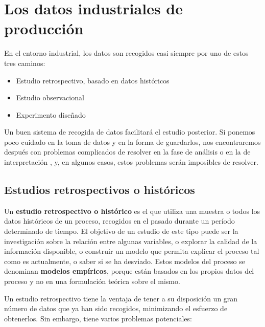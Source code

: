 \documentclass[
  letterpaper,
  DIV=11,
  numbers=noendperiod,
  oneside]{scrreprt}
\providecommand{\tightlist}{%
  \setlength{\itemsep}{0pt}\setlength{\parskip}{0pt}}\usepackage{longtable,booktabs,array}
\begin{document}
\hypertarget{los-datos-industriales-de-producciuxf3n}{%
\chapter{Los datos industriales de
producción}\label{los-datos-industriales-de-producciuxf3n}}

En el entorno industrial, los datos son recogidos casi siempre por uno
de estos tres caminos:

\begin{itemize}
\tightlist
\item
  Estudio retrospectivo, basado en datos históricos
\item
  Estudio observacional
\item
  Experimento diseñado
\end{itemize}

Un buen sistema de recogida de datos facilitará el estudio posterior. Si
ponemos poco cuidado en la toma de datos y en la forma de guardarlos,
nos encontraremos después con problemas complicados de resolver en la
fase de análisis o en la de interpretación , y, en algunos casos, estos
problemas serán imposibles de resolver.

\hypertarget{estudios-retrospectivos-o-histuxf3ricos}{%
\section{Estudios retrospectivos o
históricos}\label{estudios-retrospectivos-o-histuxf3ricos}}

Un \textbf{estudio retrospectivo o histórico} es el que utiliza una
muestra o todos los datos históricos de un proceso, recogidos en el
pasado durante un período determinado de tiempo. El objetivo de un
estudio de este tipo puede ser la investigación sobre la relación entre
algunas variables, o explorar la calidad de la información disponible, o
construir un modelo que permita explicar el proceso tal como es
actualmente, o saber si se ha desviado. Estos modelos del proceso se
denominan \textbf{modelos empíricos}, porque están basados en los
propios datos del proceso y no en una formulación teórica sobre el
mismo.

Un estudio retrospectivo tiene la ventaja de tener a su disposición un
gran número de datos que ya han sido recogidos, minimizando el esfuerzo
de obtenerlos. Sin embargo, tiene varios problemas potenciales:
\end{document}
